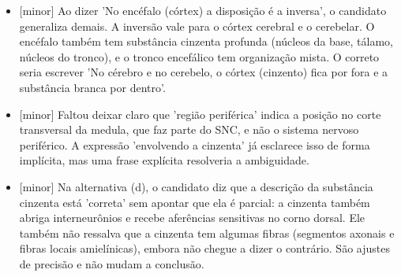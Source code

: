 \documentclass{article}%
\begin{document}
\begin{itemize}%
\item%
{[}minor{]} Ao dizer 'No encéfalo (córtex) a disposição é a inversa', o candidato generaliza demais. A inversão vale para o córtex cerebral e o cerebelar. O encéfalo também tem substância cinzenta profunda (núcleos da base, tálamo, núcleos do tronco), e o tronco encefálico tem organização mista. O correto seria escrever 'No cérebro e no cerebelo, o córtex (cinzento) fica por fora e a substância branca por dentro'.%
\item%
{[}minor{]} Faltou deixar claro que 'região periférica' indica a posição no corte transversal da medula, que faz parte do SNC, e não o sistema nervoso periférico. A expressão 'envolvendo a cinzenta' já esclarece isso de forma implícita, mas uma frase explícita resolveria a ambiguidade.%
\item%
{[}minor{]} Na alternativa (d), o candidato diz que a descrição da substância cinzenta está 'correta' sem apontar que ela é parcial: a cinzenta também abriga interneurônios e recebe aferências sensitivas no corno dorsal. Ele também não ressalva que a cinzenta tem algumas fibras (segmentos axonais e fibras locais amielínicas), embora não chegue a dizer o contrário. São ajustes de precisão e não mudam a conclusão.%
\end{itemize}%
\end{document}
